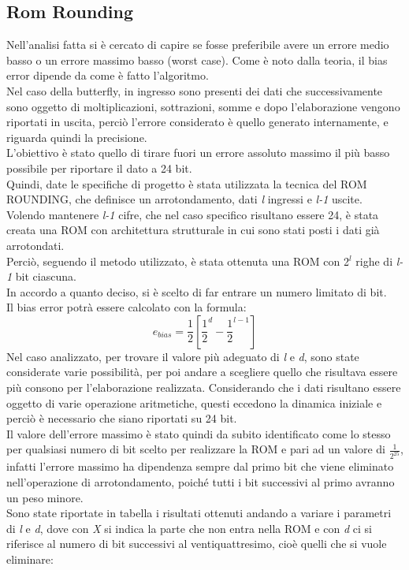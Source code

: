 \documentclass[a4paper, titlepage]{article}
\begin{document}
\subsection{Rom Rounding} %
Nell'analisi fatta si è cercato di capire se fosse preferibile avere un errore medio basso o un errore massimo basso (worst case). Come è noto dalla teoria, il bias error dipende da come è fatto l'algoritmo.\\Nel caso della butterfly, in ingresso sono presenti dei dati che successivamente sono oggetto di moltiplicazioni, sottrazioni, somme e dopo l'elaborazione vengono riportati in uscita, perciò l'errore considerato è quello generato internamente, e riguarda quindi la precisione.\\ L'obiettivo è stato quello di tirare fuori un errore assoluto massimo il più basso possibile per riportare il dato a 24 bit.\\Quindi, date le specifiche di progetto è stata utilizzata la tecnica del ROM ROUNDING, che definisce un arrotondamento, dati \textit{l} ingressi e \textit{l-1} uscite. Volendo  mantenere \textit{l-1} cifre, che nel caso specifico risultano essere 24, è stata creata una ROM con architettura strutturale in cui sono stati posti i dati già arrotondati.\\Perciò, seguendo il metodo utilizzato, è stata ottenuta una ROM con 2$^{l}$ righe di \textit{l-1} bit ciascuna.\\In accordo a quanto deciso, si è scelto di far entrare un numero limitato di bit.\\Il bias error potrà essere calcolato con la formula:
\begin{equation}
e_{bias}=\frac{1}{2}\left [ \frac{1}{2}^{d} -\frac{1}{2}^{l-1}\right ]
\end{equation}
Nel caso analizzato, per trovare il valore più adeguato di \textit{l}  e \textit{d}, sono state considerate varie possibilità, per poi andare a scegliere quello che risultava essere più consono per l'elaborazione realizzata. Considerando che i dati risultano essere oggetto di varie operazione aritmetiche, questi eccedono la dinamica iniziale e perciò è necessario che siano riportati su 24 bit.\\Il valore dell'errore massimo è stato quindi da subito identificato come lo stesso per qualsiasi numero di bit scelto per realizzare la ROM e pari ad un valore di $\frac{1}{2^{25}}$, infatti l'errore massimo ha dipendenza sempre dal primo bit che viene eliminato nell'operazione di arrotondamento, poiché tutti i bit successivi al primo avranno un peso minore.\\Sono state riportate in tabella i risultati ottenuti andando a variare i parametri di \textit{l} e \textit{d}, dove con \textit{X} si indica la parte che non entra nella ROM e con \textit{d} ci si riferisce al numero di bit successivi al ventiquattresimo, cioè quelli che si vuole eliminare:\\
\end{document}
